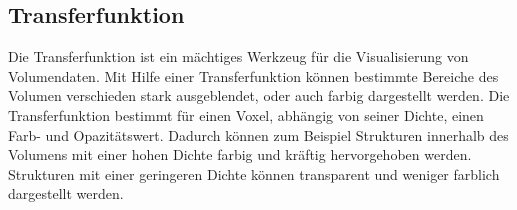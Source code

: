 \subsection{Transferfunktion}
Die Transferfunktion ist ein mächtiges Werkzeug für die Visualisierung von Volumendaten.
Mit Hilfe einer Transferfunktion können bestimmte Bereiche des Volumen verschieden stark ausgeblendet, oder auch farbig dargestellt werden.
Die Transferfunktion bestimmt für einen Voxel, abhängig von seiner Dichte, einen Farb- und Opazitätswert.
Dadurch können zum Beispiel Strukturen innerhalb des Volumens mit einer hohen Dichte farbig und kräftig hervorgehoben werden.
Strukturen mit einer geringeren Dichte können transparent und weniger farblich dargestellt werden.

